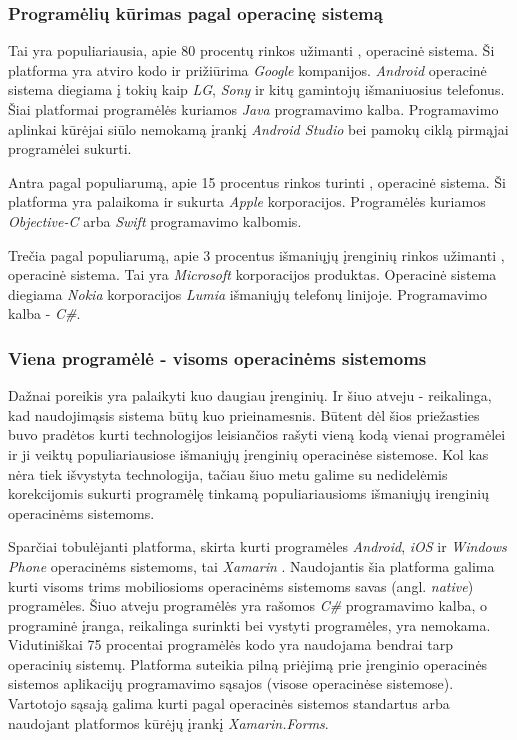 \documentclass{VUMIFPSkursinis}
\begin{document}
\subsubsection{Programėlių kūrimas pagal operacinę sistemą}

Tai yra populiariausia, apie 80 procentų rinkos užimanti \cite{MarketShareByOS}, operacinė sistema. Ši platforma yra atviro kodo ir prižiūrima \textit{Google} kompanijos. \textit{Android} operacinė sistema diegiama į tokių kaip \textit{LG}, \textit{Sony} ir kitų gamintojų išmaniuosius telefonus. Šiai platformai programėlės kuriamos \textit{Java} programavimo kalba. Programavimo aplinkai kūrėjai siūlo nemokamą įrankį \textit{Android Studio} bei pamokų ciklą pirmąjai programėlei sukurti.

Antra pagal populiarumą, apie 15 procentus rinkos turinti \cite{MarketShareByOS}, operacinė sistema. Ši platforma yra palaikoma ir sukurta \textit{Apple} korporacijos. Programėlės kuriamos \textit{Objective-C} arba \textit{Swift} programavimo kalbomis.

Trečia pagal populiarumą, apie 3 procentus išmaniųjų įrenginių rinkos užimanti \cite{MarketShareByOS}, operacinė sistema. Tai yra \textit{Microsoft} korporacijos produktas. Operacinė sistema diegiama \textit{Nokia} korporacijos \textit{Lumia} išmaniųjų telefonų linijoje. Programavimo kalba - \textit{C\#}.

\subsubsection{Viena programėlė - visoms operacinėms sistemoms}
Dažnai poreikis yra palaikyti kuo daugiau įrenginių. Ir šiuo atveju - reikalinga, kad naudojimąsis sistema būtų kuo prieinamesnis. Būtent dėl šios priežasties buvo pradėtos kurti technologijos leisiančios rašyti vieną kodą vienai programėlei ir ji veiktų populiariausiose išmaniųjų įrenginių operacinėse sistemose. Kol kas nėra tiek išvystyta technologija, tačiau šiuo metu galime su nedidelėmis korekcijomis sukurti programėlę tinkamą populiariausioms išmaniųjų irenginių operacinėms sistemoms.


Sparčiai tobulėjanti platforma, skirta kurti programėles \textit{Android}, \textit{iOS} ir \textit{Windows Phone} operacinėms sistemoms, tai \textit{Xamarin} \cite{xamarin}. Naudojantis šia platforma galima kurti visoms trims mobiliosioms operacinėms sistemoms savas (angl. \textit{native}) programėles. Šiuo atveju programėlės yra rašomos \textit{C\#} programavimo kalba, o programinė įranga, reikalinga surinkti bei vystyti programėles, yra nemokama. Vidutiniškai 75 procentai programėlės kodo yra naudojama bendrai tarp operacinių sistemų. Platforma suteikia pilną priėjimą prie įrenginio operacinės sistemos aplikacijų programavimo sąsajos (visose operacinėse sistemose). Vartotojo sąsają galima kurti pagal operacinės sistemos standartus arba naudojant platformos kūrėjų įrankį \textit{Xamarin.Forms}.
\end{document}
